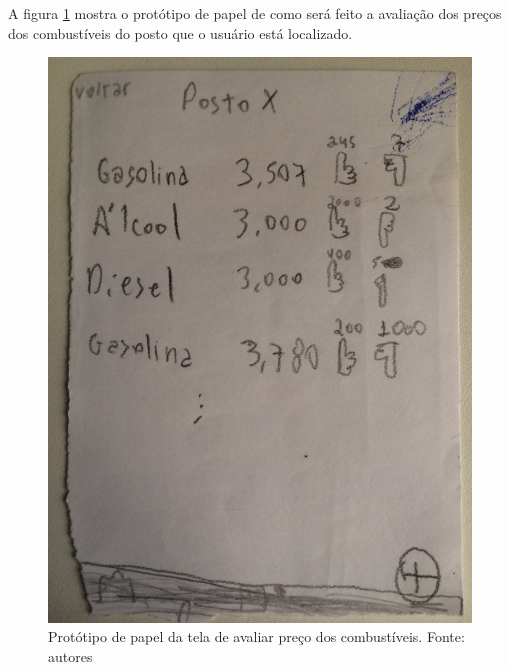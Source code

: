 A figura \ref{img:prototipo_de_papel_precos_combustiveis} mostra o protótipo de papel de como será feito a avaliação dos preços dos combustíveis do posto que o usuário está localizado.
\begin{figure}[H]
    \centering
    \includegraphics[scale=0.1, angle=-90]{figuras/prototipo_papel_avaliar_precos_postos.jpg}
    \caption[Protótipo de papel da tela de avaliar preço dos combustíveis]{Protótipo de papel da tela de avaliar preço dos combustíveis. Fonte: autores}
    \label{img:prototipo_de_papel_precos_combustiveis}
\end{figure}
 \pagebreak
 
